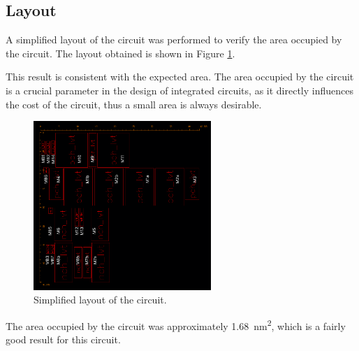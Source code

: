 \subsection{Layout}

A simplified layout of the circuit was performed to verify the area occupied by the circuit. The layout obtained is shown in Figure \ref{fig:layout}.

This result is consistent with the expected area. The area occupied by the circuit is a crucial parameter in the design of integrated circuits, as it directly influences the cost of the circuit, thus a small area is always desirable.

\begin{figure}[H]
    \centering
    \includegraphics[width=0.6\textwidth]{Images/layout.png}
    \caption{Simplified layout of the circuit.}
    \label{fig:layout}
\end{figure}

The area occupied by the circuit was approximately \SI{1.68}{\nano\meter\squared}, which is a fairly good result for this circuit.